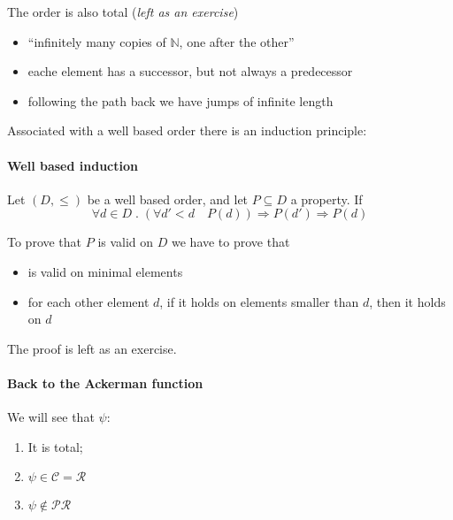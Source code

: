 \documentclass{amsbook}
\newcommand{\nat}{\ensuremath{\mathbb{N}}}
\theoremstyle{definition}
\theoremstyle{remark}
\numberwithin{section}{chapter}
\numberwithin{equation}{chapter}
\begin{document}
The order is also total (\emph{left as an exercise})
\begin{itemize}
\item ``infinitely many copies of $\nat$, one after the other''
\item eache element has a successor, but not always a predecessor
\item following the path back we have jumps of infinite length
\end{itemize}

Associated with a well based order there is an induction principle:

\paragraph{\textbf{Well based induction}}

Let $(D, \leq)$ be a well based order, and let $P \subseteq D$ a
property. If
\[
  \forall d \in D \; . \; (\forall d' < d \quad P(d)) \Rightarrow P(d') \Rightarrow P(d)
\]

To prove that $P$ is valid on $D$ we have to prove that
\begin{itemize}
\item is valid on minimal elements
\item for each other element $d$, if it holds on elements smaller than
  $d$, then it holds on $d$
\end{itemize}

The proof is left as an exercise.

\paragraph{\textbf{Back to the Ackerman function}}

We will see that $\psi$:
\begin{enumerate}
	\item It is total;
	\item $ \psi \in \mathcal{C} = \mathcal{R} $
	\item $ \psi \not \in \mathcal{PR} $
\end{enumerate}



\end{document}

